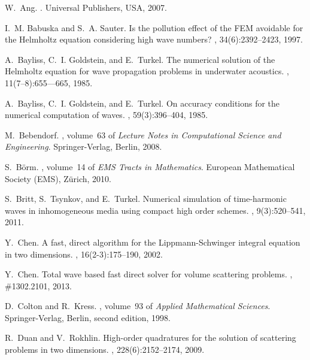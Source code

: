 \documentclass[11pt,final]{amsart}
\theoremstyle{definition}
\numberwithin{remark}{section}
\numberwithin{definition}{section}
\numberwithin{pro}{section}
\begin{document}
\begin{thebibliography}{}

W.~Ang.
.
\newblock Universal Publishers, USA, 2007.

I.~M. Babuska and S.~A. Sauter.
\newblock Is the pollution effect of the {FEM} avoidable for the {H}elmholtz
  equation considering high wave numbers?
, 34(6):2392--2423, 1997.

A.~Bayliss, C.~I. Goldstein, and E.~Turkel.
\newblock The numerical solution of the {H}elmholtz equation for wave
  propagation problems in underwater acoustics.
, 11(7--8):655–--665, 1985.

A.~Bayliss, C.~I. Goldstein, and E.~Turkel.
\newblock On accuracy conditions for the numerical computation of waves.
, 59(3):396--404, 1985.

M.~Bebendorf.
, volume~63 of {\em Lecture Notes in
  Computational Science and Engineering}.
\newblock Springer-Verlag, Berlin, 2008.

S.~B{\"o}rm.
, volume~14
  of {\em EMS Tracts in Mathematics}.
\newblock European Mathematical Society (EMS), Z\"urich, 2010.

S.~Britt, S.~Tsynkov, and E.~Turkel.
\newblock Numerical simulation of time-harmonic waves in inhomogeneous media
  using compact high order schemes.
, 9(3):520--541, 2011.

Y.~Chen.
\newblock A fast, direct algorithm for the {L}ippmann-{S}chwinger integral
  equation in two dimensions.
, 16(2-3):175--190, 2002.

Y.~Chen.
\newblock Total wave based fast direct solver for volume scattering problems.
, \#1302.2101, 2013.

D.~Colton and R.~Kress.
,
  volume~93 of {\em Applied Mathematical Sciences}.
\newblock Springer-Verlag, Berlin, second edition, 1998.

R.~Duan and V.~Rokhlin.
\newblock High-order quadratures for the solution of scattering problems in two
  dimensions.
, 228(6):2152--2174, 2009.


\end{thebibliography}
\end{document}

